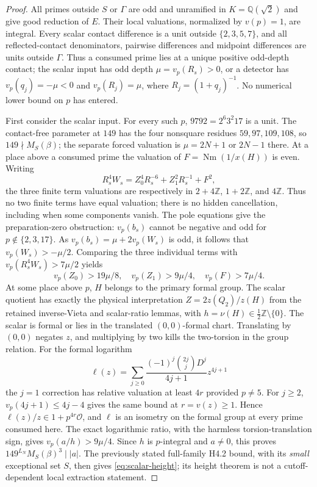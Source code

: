 \documentclass[11pt,a4paper]{article}
\newcommand{\Q}{\mathbb Q}\newcommand{\Z}{\mathbb Z}
\begin{document}
\begin{proof}
All primes outside $S$ or $\Gamma$ are odd and unramified in
$K=\Q(\sqrt2)$ and give good reduction of $E$.
Their local valuations, normalized by $v(p)=1$, are integral.
Every scalar contact difference is a unit outside
$\{2,3,5,7\}$, and all reflected-contact denominators,
pairwise differences and midpoint differences are units
outside $\Gamma$. Thus a consumed prime lies at a unique
positive odd-depth contact; the scalar input has odd depth
$\mu=v_p(R_s)>0$, or a detector has
$v_p(q_j)=-\mu<0$ and $v_p(R_j)=\mu$, where
$R_j=(1+q_j)^{-1}$. No numerical lower bound on $p$
has entered.

First consider the scalar input. For every such $p$,
$9792=2^6 3^2 17$ is a unit. The contact-free
parameter at $149$ has the four nonsquare residues
$59,97,109,108$, so $149\nmid M_S(\beta)$; the separate
forced valuation is $\mu=2N+1$ or $2N-1$ there.
At a place above a consumed prime the valuation of
$F=\operatorname{Nm}(1/x(H))$ is even.
Writing
\[
 R_s^4W_s=Z_0^4R_s^{-6}+Z_1^2R_s^{-1}+F^2,
\]
the three finite term valuations are respectively in
$2+4\Z$, $1+2\Z$, and $4\Z$.
Thus no two finite terms have equal valuation; there is
no hidden cancellation, including when some components vanish.
The pole equations give the preparation-zero obstruction:
$v_p(b_s)$ cannot be negative and odd for
$p\notin\{2,3,17\}$. As
$v_p(b_s)=\mu+2v_p(W_s)$ is odd, it follows that
$v_p(W_s)>-\mu/2$. Comparing the three individual terms
with $v_p(R_s^4W_s)>7\mu/2$ yields
\[
 v_p(Z_0)>19\mu/8,\quad
 v_p(Z_1)>9\mu/4,\quad
 v_p(F)>7\mu/4 .
\]
At some place above $p$, $H$ belongs to the primary
formal group. The scalar quotient has exactly the physical
interpretation $Z=2z(Q_2)/z(H)$ from the retained
inverse-Vieta and scalar-ratio lemmas, with
$h=\nu(H)\in\tfrac12\Z\setminus\{0\}$.
The scalar is formal or lies in the translated
$(0,0)$-formal chart. Translating by $(0,0)$ negates $z$,
and multiplying by two kills the two-torsion in the
group relation. For the formal logarithm
\[
 \ell(z)=\sum_{j\ge0}
   \frac{(-1)^j\binom{2j}{j}D^j}{4j+1}z^{4j+1}
\]
the $j=1$ correction has relative valuation at least $4r$
provided $p\ne5$. For $j\ge2$,
$v_p(4j+1)\le4j-4$ gives the same bound at $r=v(z)\ge1$.
Hence $\ell(z)/z\in1+p^{4r}\mathcal O$, and $\ell$
is an isometry on the formal group at every prime consumed
here. The exact logarithmic ratio, with the harmless
torsion-translation sign, gives $v_p(a/h)>9\mu/4$.
Since $h$ is $p$-integral and $a\ne0$, this proves
$149^{L_N}M_S(\beta)^3\mid |a|$.
The previously stated full-family H4.2 bound, with its
\emph{small} exceptional set $S$, then gives
\eqref{eq:scalar-height}; its height theorem is not a
cutoff-dependent local extraction statement.


\end{proof}
\end{document}
